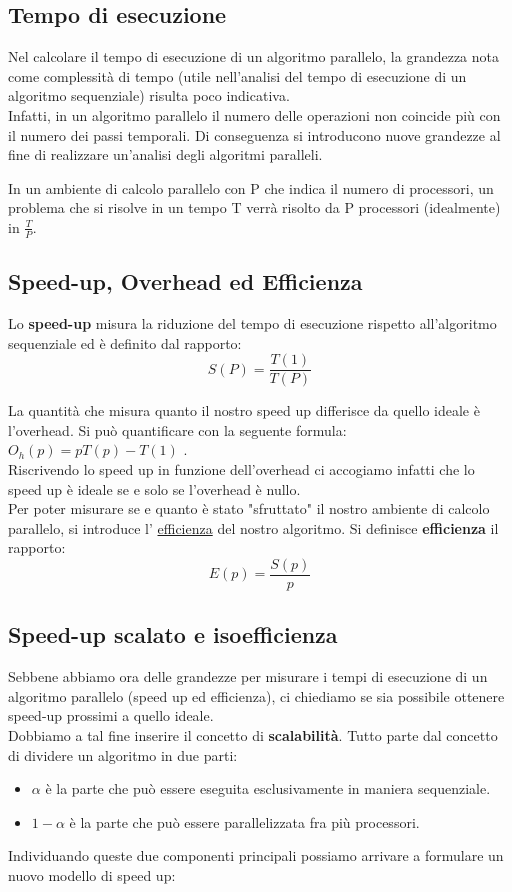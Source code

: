 \documentclass{article}
\begin{document}
\subsection{Tempo di esecuzione}

Nel calcolare il tempo di esecuzione di un algoritmo parallelo, la grandezza nota come complessità di tempo (utile nell'analisi del tempo di esecuzione di un algoritmo sequenziale) risulta poco indicativa.\\
Infatti, in un algoritmo parallelo il numero delle operazioni non coincide più con il numero dei passi temporali. Di conseguenza si introducono nuove grandezze al fine di realizzare un'analisi degli algoritmi paralleli.

In un ambiente di calcolo parallelo con P che indica il numero di processori, un problema che si risolve in un tempo T verrà risolto da P processori (idealmente) in $\frac{T}{P}$.


\subsection{Speed-up, Overhead ed Efficienza}

Lo \textbf{speed-up} misura la riduzione del tempo di esecuzione rispetto all'algoritmo sequenziale ed è definito dal rapporto:
$$ S(P) = \frac{T(1)}{T(P)} $$ 


La quantità che misura quanto il nostro speed up differisce da quello ideale è l'overhead. Si può quantificare con la seguente formula: $O_h(p) = pT(p) - T(1)$ .\\
Riscrivendo lo speed up in funzione dell'overhead ci accogiamo infatti che lo speed up è ideale se e solo se l'overhead è nullo.\\

Per poter misurare se e quanto è stato "sfruttato" il nostro ambiente di calcolo parallelo, si introduce l' \underline{efficienza} del nostro algoritmo.
Si definisce \textbf{efficienza} il rapporto: $$ E(p) = \frac{S(p)}{p} $$

\subsection{Speed-up scalato e isoefficienza}
Sebbene abbiamo ora delle grandezze per misurare i tempi di esecuzione di un algoritmo parallelo (speed up ed efficienza),
ci chiediamo se sia possibile ottenere speed-up prossimi a quello ideale.\\
Dobbiamo a tal fine inserire il concetto di \textbf{scalabilità}.
Tutto parte dal concetto di dividere un algoritmo in due parti:
\begin{itemize}
    \item $\alpha$ è la parte che può essere eseguita esclusivamente in maniera sequenziale.
    \item $1-\alpha$ è la parte che può essere parallelizzata fra più processori.
\end{itemize}
Individuando queste due componenti principali possiamo arrivare a formulare un nuovo modello di speed up:
\end{document}

